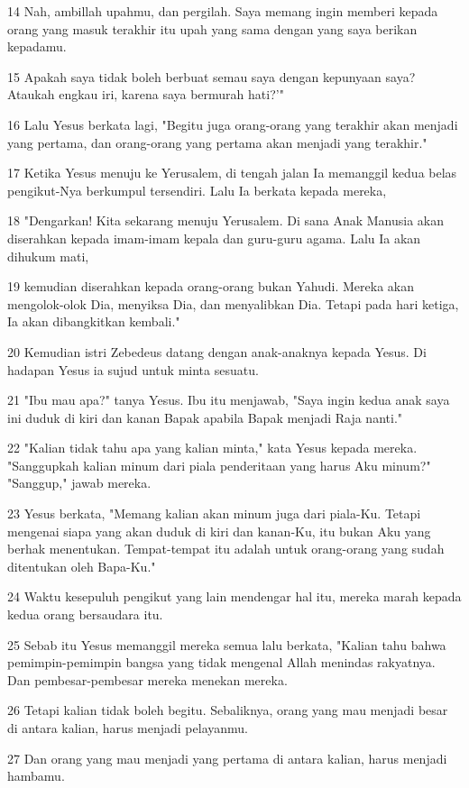 \par 14 Nah, ambillah upahmu, dan pergilah. Saya memang ingin memberi kepada orang yang masuk terakhir itu upah yang sama dengan yang saya berikan kepadamu.
\par 15 Apakah saya tidak boleh berbuat semau saya dengan kepunyaan saya? Ataukah engkau iri, karena saya bermurah hati?'"
\par 16 Lalu Yesus berkata lagi, "Begitu juga orang-orang yang terakhir akan menjadi yang pertama, dan orang-orang yang pertama akan menjadi yang terakhir."
\par 17 Ketika Yesus menuju ke Yerusalem, di tengah jalan Ia memanggil kedua belas pengikut-Nya berkumpul tersendiri. Lalu Ia berkata kepada mereka,
\par 18 "Dengarkan! Kita sekarang menuju Yerusalem. Di sana Anak Manusia akan diserahkan kepada imam-imam kepala dan guru-guru agama. Lalu Ia akan dihukum mati,
\par 19 kemudian diserahkan kepada orang-orang bukan Yahudi. Mereka akan mengolok-olok Dia, menyiksa Dia, dan menyalibkan Dia. Tetapi pada hari ketiga, Ia akan dibangkitkan kembali."
\par 20 Kemudian istri Zebedeus datang dengan anak-anaknya kepada Yesus. Di hadapan Yesus ia sujud untuk minta sesuatu.
\par 21 "Ibu mau apa?" tanya Yesus. Ibu itu menjawab, "Saya ingin kedua anak saya ini duduk di kiri dan kanan Bapak apabila Bapak menjadi Raja nanti."
\par 22 "Kalian tidak tahu apa yang kalian minta," kata Yesus kepada mereka. "Sanggupkah kalian minum dari piala penderitaan yang harus Aku minum?" "Sanggup," jawab mereka.
\par 23 Yesus berkata, "Memang kalian akan minum juga dari piala-Ku. Tetapi mengenai siapa yang akan duduk di kiri dan kanan-Ku, itu bukan Aku yang berhak menentukan. Tempat-tempat itu adalah untuk orang-orang yang sudah ditentukan oleh Bapa-Ku."
\par 24 Waktu kesepuluh pengikut yang lain mendengar hal itu, mereka marah kepada kedua orang bersaudara itu.
\par 25 Sebab itu Yesus memanggil mereka semua lalu berkata, "Kalian tahu bahwa pemimpin-pemimpin bangsa yang tidak mengenal Allah menindas rakyatnya. Dan pembesar-pembesar mereka menekan mereka.
\par 26 Tetapi kalian tidak boleh begitu. Sebaliknya, orang yang mau menjadi besar di antara kalian, harus menjadi pelayanmu.
\par 27 Dan orang yang mau menjadi yang pertama di antara kalian, harus menjadi hambamu.

